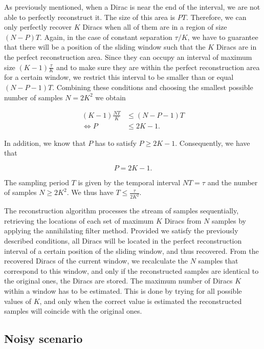 \documentclass{article}
\begin{document}
As previously mentioned, when a Dirac is near the end of the interval, we are
not able to perfectly reconstruct it. The size of this area is $PT$.
Therefore, we can only perfectly recover $K$ Diracs when all of them are 
in a region of size $(N-P)T$. Again, in the case of constant separation $\tau / K$, 
we have to guarantee that there
will be a position of the sliding window such that the $K$ Diracs are in the perfect reconstruction area. 
Since they can occupy an interval of maximum size $(K-1) \tfrac{\tau}{K}$ and to 
make sure they are within the perfect reconstruction area for a certain window, we restrict this interval
to be smaller than or equal $(N-P-1)T$. Combining these conditions and choosing 
the smallest possible number of samples $N=2K^2$ we obtain

\begin{equation}
\begin{aligned}
(K-1) \frac{NT}{K} & \leq (N-P-1)T \\
\Leftrightarrow 
P                  & \leq 2K - 1.
\end{aligned}
\end{equation}

In addition, we know that $P$ has to satisfy $P \geq 2K - 1$. Consequently, we have that

\begin{equation}
{P=2K-1}.
\end{equation}

\noindent
The sampling period $T$ is given by the temporal interval $NT=\tau$ and
the number of samples $N \geq 2K^2$. We thus have $T \leq \tfrac{\tau}{2K^2}$.

The reconstruction algorithm processes the stream of samples sequentially, retrieving 
the locations of each set of maximum $K$ Diracs from $N$ samples by applying the annihilating filter method. 
Provided we satisfy the previously described conditions, all Diracs will 
be located in the perfect reconstruction interval of a certain position of the sliding window,
and thus recovered.
From the recovered Diracs of the current window, we recalculate
the $N$ samples that correspond to this window, and only if the reconstructed samples
are identical to the original ones, the Diracs are stored. 
The maximum number of Diracs $K$ within a window has to be estimated.
This is done by trying for all possible values of $K$, and only
when the correct value is estimated the reconstructed samples will coincide with the 
original ones. 

\subsection{Noisy scenario}
\end{document}
